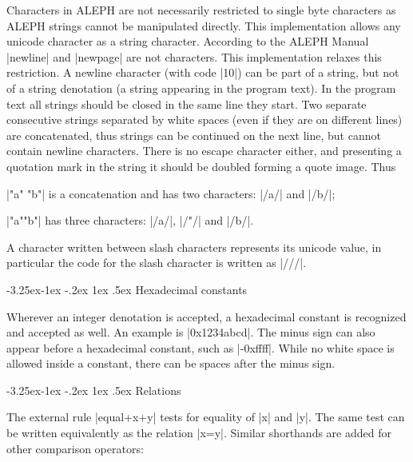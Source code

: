 \documentclass[titlepage]{article}
\makeatletter
\newcommand\A{\textsf{ALEPH}}
\newcommand\g[1]{\textsf{\color{blue!90!black}#1}}
\renewcommand\subsection{%
\@startsection{subsection}{2}{\z@}%
   {-3.25ex\@plus -1ex \@minus -.2ex}%
   {1ex \@plus .5ex}%
   {\normalfont\normalsize\bfseries}}
\makeatother
\begin{document}
Characters in \A{} are not necessarily restricted to single byte characters as
\A{} strings cannot be manipulated directly. This implementation allows any
unicode character as a string character. According to the \A{} Manual
\pp|newline| and \pp|newpage| are not characters. This implementation
relaxes this restriction. A newline character (with code \pp|10|) can be
part of a string, but not of a \g{string denotation} (a string appearing in
the program text). In the program text all strings should be closed in the
same line they start. Two separate consecutive strings separated by white
spaces (even if they are on
different lines) are concatenated, thus strings can be continued on the next
line, but cannot contain newline characters. There is no escape character
either, and presenting a quotation mark in the string it should be doubled
forming a \g{quote image}. Thus

\smallskip

\HH\pp|"a" "b"| \HE is a concatenation and has two characters: \pp|/a/| and
\pp|/b/|;

\HH\pp|"a""b"|  \HE has three characters: \pp|/a/|, \pp|/"/| and \pp|/b/|.

\smallskip
\noindent
A character written between slash characters represents its unicode value,
in particular the code for the slash character is written as \pp|///|.
 

\subsection{Hexadecimal constants}

Wherever an \g{integer denotation} is accepted, a hexadecimal constant is
recognized and accepted as well. An example is \pp|0x1234abcd|. The
minus sign can also appear before a hexadecimal constant, such as \pp|-0xffff|.
While no white space is allowed inside a constant, there can be spaces
after the minus sign.


\subsection{Relations}\label{subsec:relations}

The external rule \pp|equal+x+y| tests for equality of \pp|x| and \pp|y|.
The same test can be written equivalently as the \g{relation} \pp|x=y|.
Similar shorthands are added for other comparison operators:
\end{document}
